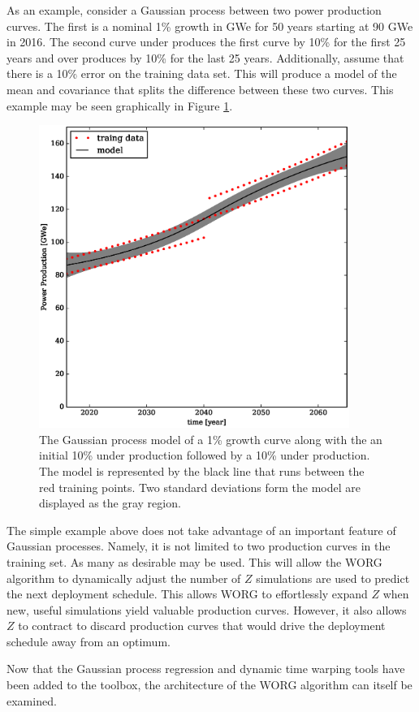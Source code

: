 As an example, consider a Gaussian process between two power production 
curves. The first is a nominal 1\% growth in GWe for 50 years starting at 
90 GWe in 2016. The second curve under produces the first curve by 10\% 
for the first 25 years and over produces by 10\% for the last 25 years.
Additionally, assume that there is a 10\% error on the training data set.
This will produce a model of the mean and covariance that splits the 
difference between these two curves. This example may be seen graphically
in Figure \ref{gwe-model-}.

\begin{figure}[htb]
\centering
\includegraphics[width=0.9\textwidth]{gwe-model-.eps}
\caption{The Gaussian process model of a 1\% growth curve along with the
an initial 10\% under production followed by a 10\% under production. 
The model is represented by the black line that runs between the red 
training points. Two standard deviations form the model are displayed as the
gray region.}
\label{gwe-model-}
\end{figure}

The simple example above does not take advantage of an important 
feature of Gaussian processes. Namely, it is not limited to two production
curves in the training set.  As many as desirable may be used.  This will
allow the WORG algorithm to dynamically adjust the number of $Z$ simulations 
are used to predict the next deployment schedule. This allows WORG to 
effortlessly expand $Z$ when new, useful simulations yield valuable production
curves.  However, it also allows $Z$ to contract to discard production
curves that would drive the deployment schedule away from an optimum.

Now that the Gaussian process regression and dynamic time warping tools have 
been added to the toolbox, the architecture of the WORG algorithm can 
itself be examined.

\clearpage

